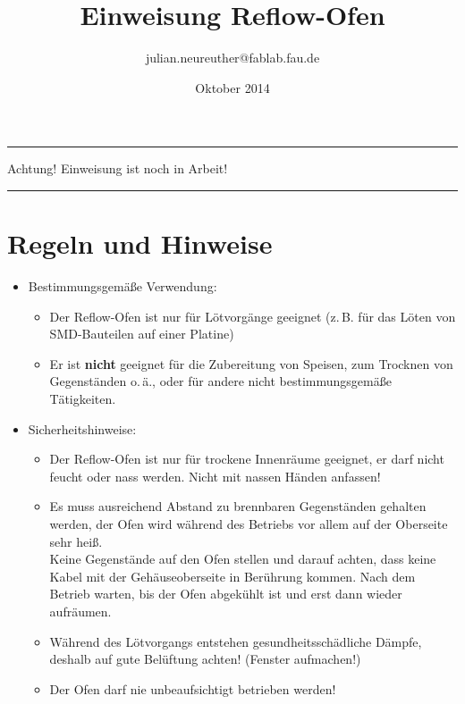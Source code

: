 \documentclass{\basedir/fablab-document}
\date{Oktober 2014}
\author{julian.neureuther@fablab.fau.de}
\title{Einweisung Reflow-Ofen}
\begin{document}
\dosecttoc
\faketableofcontents
{}

\color{red}
\hrule
\begin{center}
\large{Achtung! Einweisung ist noch in Arbeit!}
\vspace{0.1cm}
\end{center}
\hrule
\color{black}

\section[Regeln und (Sicherheits-)Hinweise]{Regeln und Hinweise}
\begin{itemize}
\item Bestimmungsgemäße Verwendung:
\begin{itemize}
\item Der Reflow-Ofen ist nur für Lötvorgänge geeignet (z.\,B. für das Löten von SMD-Bauteilen auf einer Platine)
\item Er ist \textbf{nicht} geeignet für die Zubereitung von Speisen, zum Trocknen von Gegenständen o.\,ä., oder für andere nicht bestimmungsgemäße Tätigkeiten.
\end{itemize}
\item Sicherheitshinweise:
\begin{itemize}
\item Der Reflow-Ofen ist nur für trockene Innenräume geeignet, er darf nicht feucht oder nass werden. Nicht mit nassen Händen anfassen!
\item Es muss ausreichend Abstand zu brennbaren Gegenständen gehalten werden, der Ofen wird während des Betriebs vor allem auf der Oberseite sehr heiß. \\
Keine Gegenstände auf den Ofen stellen und darauf achten, dass keine Kabel mit der Gehäuseoberseite in Berührung kommen. Nach dem Betrieb warten, bis der Ofen abgekühlt ist und erst dann wieder aufräumen.
\item Während des Lötvorgangs entstehen gesundheitsschädliche Dämpfe, deshalb auf gute Belüftung achten! (Fenster aufmachen!)
\item Der Ofen darf nie unbeaufsichtigt betrieben werden!
\end{itemize}
\end{itemize}
\end{document}
